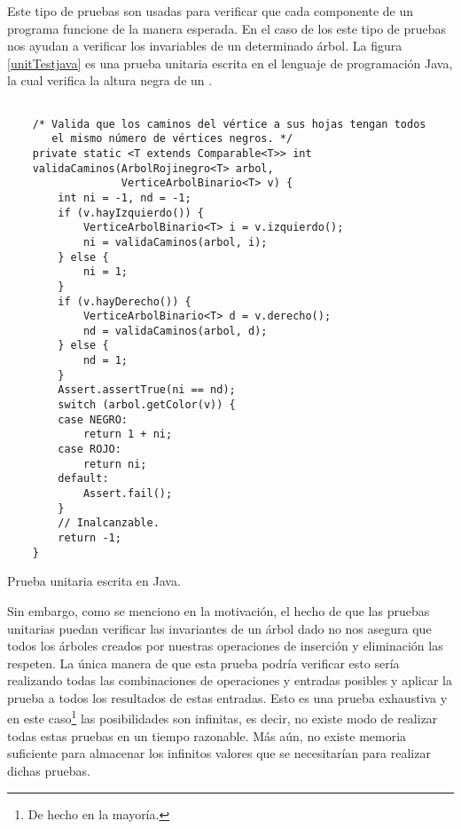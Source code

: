 Este tipo de pruebas son usadas para verificar que cada componente de un programa funcione de
la manera esperada. En el caso de los {\arns} este tipo de pruebas nos ayudan a verificar los
invariables de un determinado \'arbol. La figura \ref{unitTestjava} es una prueba unitaria
escrita en el lenguaje de programaci\'on Java, la cual verifica la altura negra de un {\arn} \cite{CanekPU}.

\begin{listing}[!ht]
\centering
\captionsetup{justification=centering}
\begin{verbatim}

    /* Valida que los caminos del vértice a sus hojas tengan todos
       el mismo número de vértices negros. */
    private static <T extends Comparable<T>> int
    validaCaminos(ArbolRojinegro<T> arbol,
                  VerticeArbolBinario<T> v) {
        int ni = -1, nd = -1;
        if (v.hayIzquierdo()) {
            VerticeArbolBinario<T> i = v.izquierdo();
            ni = validaCaminos(arbol, i);
        } else {
            ni = 1;
        }
        if (v.hayDerecho()) {
            VerticeArbolBinario<T> d = v.derecho();
            nd = validaCaminos(arbol, d);
        } else {
            nd = 1;
        }
        Assert.assertTrue(ni == nd);
        switch (arbol.getColor(v)) {
        case NEGRO:
            return 1 + ni;
        case ROJO:
            return ni;
        default:
            Assert.fail();
        }
        // Inalcanzable.
        return -1;
    }

\end{verbatim}
\caption{Prueba unitaria escrita en Java\cite{CanekPU}.}
\label{unitTestjava}
\end{listing}

Sin embargo, como se menciono en la motivaci\'on, el hecho de que las pruebas unitarias puedan verificar las invariantes de un \'arbol
dado no nos asegura que todos los \'arboles creados por nuestras operaciones de inserci\'on y
eliminaci\'on las respeten. La \'unica manera de que esta prueba podr\'ia verificar esto ser\'ia
realizando todas las combinaciones de operaciones y entradas posibles y aplicar la prueba a todos los
resultados de estas entradas. Esto es una prueba exhaustiva y en este caso\footnote{De hecho en la
mayoría.} las posibilidades son infinitas, es decir, no existe modo de realizar todas estas pruebas
en un tiempo razonable. M\'as a\'un, no existe memoria suficiente para almacenar los infinitos valores que se necesitar\'ian para realizar dichas pruebas. 


